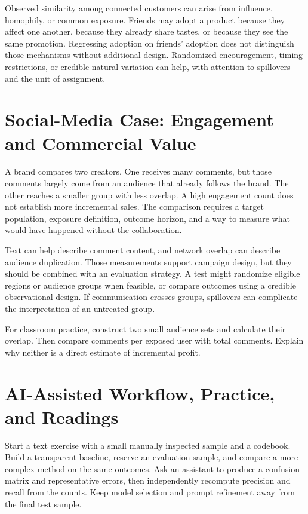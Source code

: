 Observed similarity among connected customers can arise from influence,
homophily, or common exposure. Friends may adopt a product because they
affect one another, because they already share tastes, or because they
see the same promotion. Regressing adoption on friends' adoption does
not distinguish those mechanisms without additional design. Randomized
encouragement, timing restrictions, or credible natural variation can
help, with attention to spillovers and the unit of assignment.

\hypertarget{M05-social-media-case-engagement-and-commercial-value}{%
\section{Social-Media Case: Engagement and Commercial
Value}\label{M05-social-media-case-engagement-and-commercial-value}}

\noindent A brand compares two creators. One receives many comments, but those
comments largely come from an audience that already follows the brand.
The other reaches a smaller group with less overlap. A high engagement
count does not establish more incremental sales. The comparison requires
a target population, exposure definition, outcome horizon, and a way to
measure what would have happened without the collaboration.

Text can help describe comment content, and network overlap can describe
audience duplication. Those measurements support campaign design, but
they should be combined with an evaluation strategy. A test might
randomize eligible regions or audience groups when feasible, or compare
outcomes using a credible observational design. If communication crosses
groups, spillovers can complicate the interpretation of an untreated
group.

For classroom practice, construct two small audience sets and calculate
their overlap. Then compare comments per exposed user with total
comments. Explain why neither is a direct estimate of incremental
profit.

\hypertarget{M05-ai-assisted-workflow-practice-and-readings}{%
\section{AI-Assisted Workflow, Practice, and
Readings}\label{M05-ai-assisted-workflow-practice-and-readings}}

\noindent Start a text exercise with a small manually inspected sample and a
codebook. Build a transparent baseline, reserve an evaluation sample,
and compare a more complex method on the same outcomes. Ask an assistant
to produce a confusion matrix and representative errors, then
independently recompute precision and recall from the counts. Keep model
selection and prompt refinement away from the final test sample.

